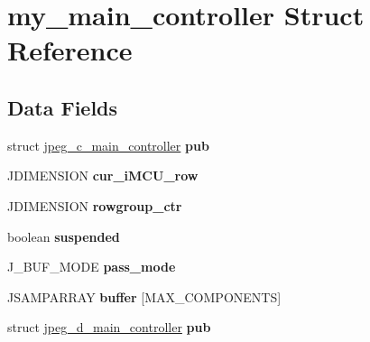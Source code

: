 \hypertarget{structmy__main__controller}{}\section{my\+\_\+main\+\_\+controller Struct Reference}
\label{structmy__main__controller}
\subsection*{Data Fields}
\begin{DoxyCompactItemize}
\item 
\mbox{\label{structmy__main__controller_a875b938725362d5fdb5c2bf3399fab36}} 
struct \hyperlink{structjpeg__c__main__controller}{jpeg\+\_\+c\+\_\+main\+\_\+controller} {\bfseries pub}
\item 
\mbox{\label{structmy__main__controller_ad70652985b2c2f90bc585b768f18ac3d}} 
J\+D\+I\+M\+E\+N\+S\+I\+ON {\bfseries cur\+\_\+i\+M\+C\+U\+\_\+row}
\item 
\mbox{\label{structmy__main__controller_af38efbcd8b18fc136414b118757fbbd9}} 
J\+D\+I\+M\+E\+N\+S\+I\+ON {\bfseries rowgroup\+\_\+ctr}
\item 
\mbox{\label{structmy__main__controller_a88c477eb73e0eb96dcdf036789445d94}} 
boolean {\bfseries suspended}
\item 
\mbox{\label{structmy__main__controller_a559fa8d8f87754109b8012fa7c17eb83}} 
J\+\_\+\+B\+U\+F\+\_\+\+M\+O\+DE {\bfseries pass\+\_\+mode}
\item 
\mbox{\label{structmy__main__controller_af22b25e0f38e68fd31f6afebfeb6b55f}} 
J\+S\+A\+M\+P\+A\+R\+R\+AY {\bfseries buffer} \mbox{[}M\+A\+X\+\_\+\+C\+O\+M\+P\+O\+N\+E\+N\+TS\mbox{]}
\item 
\mbox{\label{structmy__main__controller_ac50d9eaa212cf1427dda82b1fbd7b7d4}} 
struct \hyperlink{structjpeg__d__main__controller}{jpeg\+\_\+d\+\_\+main\+\_\+controller} {\bfseries pub}
\item 
\mbox{\label{structmy__main__controller_a4e0c17513e874e237b1d2267ae4c82bf}} 

\end{DoxyCompactItemize}
